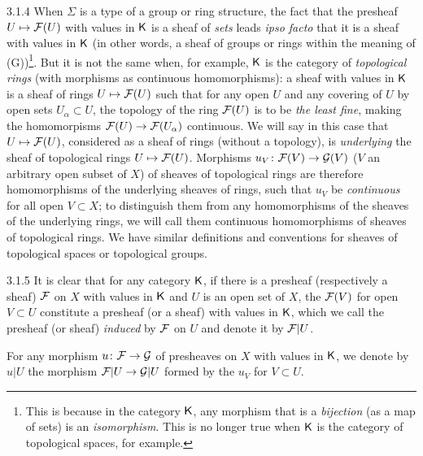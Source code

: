 \begin{env}{3.1.4}
\label{env-0.3.1.4}
When $\Sigma$ is a type of a group or ring structure, the fact that
the presheaf $U\mapsto\mathcal{F}(U)$ with values in $\mathsf{K}$ is a sheaf of \emph{sets} leads \emph{ipso facto}
that it is a sheaf with values in $\mathsf{K}$ (in other words, a sheaf of groups or rings
within the meaning of (G))\footnote{This is because in the category $\mathsf{K}$, any morphism that is a
\emph{bijection} (as a map of sets) is an \emph{isomorphism}. This is no longer true when $\mathsf{K}$
is the category of topological spaces, for example.}. But it is not the same when, for example,
$\mathsf{K}$ is the category of \emph{topological rings} (with morphisms as continuous homomorphisms): a sheaf
with values in $\mathsf{K}$ is a sheaf of rings $U\mapsto\mathcal{F}(U)$ such that for any open $U$
and any covering of $U$ by open sets $U_\alpha\subset U$, the topology of the ring $\mathcal{F}(U)$
is to be \emph{the least fine}, making the homomorpisms $\mathcal{F}(U)\to\mathcal{F}(U_\alpha)$ continuous. We will say in
this case that $U\mapsto\mathcal{F}(U)$, considered as a sheaf of rings (without a topology), is
\emph{underlying} the sheaf of topological rings $U\mapsto\mathcal{F}(U)$. Morphisms $u_V\colon\mathcal{F}(V)\to\mathcal{G}(V)$
($V$ an arbitrary open subset of $X$) of sheaves of topological rings are therefore homomorphisms of the
underlying sheaves of rings, such that $u_V$ be \emph{continuous} for all
open $V\subset X$; to distinguish them from any homomorphisms of the sheaves
of the underlying rings, we will call them continuous homomorphisms of sheaves of topological rings.
We have similar definitions and conventions for sheaves of topological spaces or topological groups.
\end{env}

\begin{env}{3.1.5}
\label{env-0.3.1.5}
It is clear that for any category $\mathsf{K}$, if there is a presheaf (respectively a
sheaf) $\mathcal{F}$ on $X$ with values in $\mathsf{K}$ and $U$ is an open set of $X$, the $\mathcal{F}(V)$ for
open $V\subset U$ constitute a presheaf (or a sheaf) with values in $\mathsf{K}$, which we call
the presheaf (or sheaf) \emph{induced} by $\mathcal{F}$ on $U$ and denote it by $\mathcal{F}|U$.

For any morphism $u\colon\mathcal{F}\to\mathcal{G}$ of presheaves on $X$ with values in $\mathsf{K}$, we
denote by $u|U$ the morphism $\mathcal{F}|U\to\mathcal{G}|U$ formed by the $u_V$ for $V\subset U$.
\end{env}

